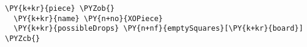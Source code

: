 \begin{Verbatim}[commandchars=\\\{\}]
\PY{k+kr}{piece} \PYZob{}
  \PY{k+kr}{name} \PY{n+no}{XOPiece}
  \PY{k+kr}{possibleDrops} \PY{n+nf}{emptySquares}[\PY{k+kr}{board}]
\PYZcb{}
\end{Verbatim}
